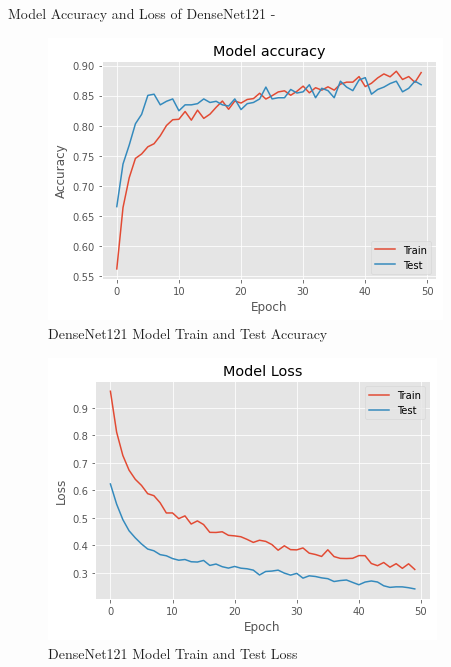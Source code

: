 \newpage
\vspace{5mm}
Model Accuracy and Loss of DenseNet121 -
\vspace{5mm}
\begin{figure}[hbt!]
\centering
\includegraphics[scale=1]{images/fig-31.png}
\caption{DenseNet121 Model Train and Test Accuracy}
\label{fig:x DenseNet121 Model Train and Test Accuracy}
\end{figure}

\vspace{5mm}
\begin{figure}[hbt!]
\centering
\includegraphics[scale=1]{images/fig-32.png}
\caption{DenseNet121 Model Train and Test Loss}
\label{fig:x DenseNet121 Model Train and Test Loss}
\end{figure}


